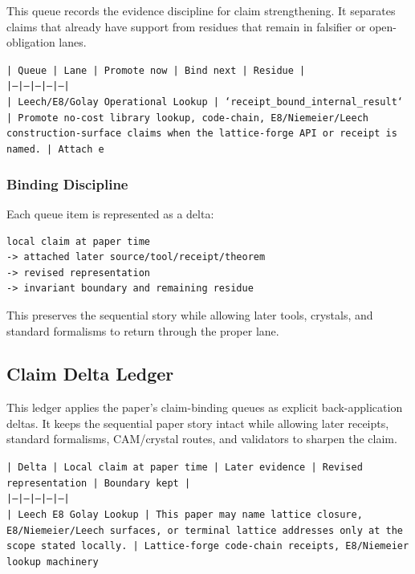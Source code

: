 \documentclass[11pt]{article}
\begin{document}
This queue records the evidence discipline for claim strengthening. It separates claims that already have support from residues that remain in falsifier or open-obligation lanes.

\noindent\texttt{| Queue | Lane | Promote now | Bind next | Residue |}\\
\noindent\texttt{|---|---|---|---|---|}\\
\noindent\texttt{| Leech/E8/Golay Operational Lookup | `receipt\_bound\_internal\_result` | Promote no-cost library lookup, code-chain, E8/Niemeier/Leech construction-surface claims when the lattice-forge API or receipt is named. | Attach e}\\

\subsubsection*{Binding Discipline}

Each queue item is represented as a delta:

\begin{verbatim}
local claim at paper time
-> attached later source/tool/receipt/theorem
-> revised representation
-> invariant boundary and remaining residue
\end{verbatim}

This preserves the sequential story while allowing later tools, crystals, and
standard formalisms to return through the proper lane.

\subsection*{Claim Delta Ledger}

This ledger applies the paper's claim-binding queues as explicit back-application
deltas. It keeps the sequential paper story intact while allowing later
receipts, standard formalisms, CAM/crystal routes, and validators to sharpen the
claim.

\noindent\texttt{| Delta | Local claim at paper time | Later evidence | Revised representation | Boundary kept |}\\
\noindent\texttt{|---|---|---|---|---|}\\
\noindent\texttt{| Leech E8 Golay Lookup | This paper may name lattice closure, E8/Niemeier/Leech surfaces, or terminal lattice addresses only at the scope stated locally. | Lattice-forge code-chain receipts, E8/Niemeier lookup machinery}\\
\end{document}
